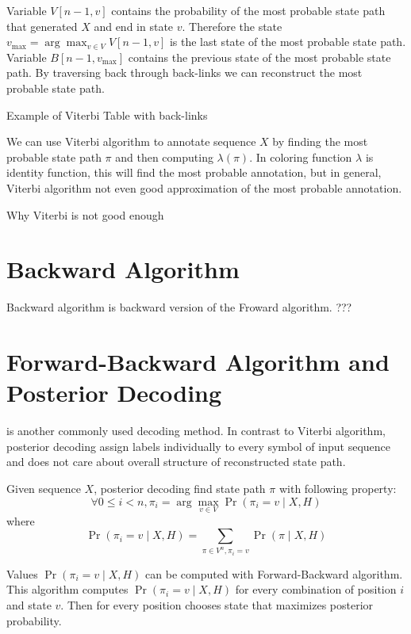 Variable $V[n-1,v]$ contains the probability of the most probable state path
that generated $X$ and end in state $v$. Therefore the state $v_{\max} =
\arg\max_{v\in V}V[n-1,v]$ is the last state of the most probable state path.
Variable $B[n-1,v_{\max}]$ contains the previous state of the most probable
state path. By traversing back through back-links  we can reconstruct the most
probable state path.

\begin{example}
Example of Viterbi Table with back-links
\end{example}

We can use Viterbi algorithm to annotate sequence $X$ by finding the most
probable state path $\pi$ and then computing $\lambda(\pi)$. In coloring
function $\lambda$ is identity function, this will find the most probable
annotation, but in general, Viterbi algorithm not even good approximation of the
most probable annotation.

\begin{example}
Why Viterbi is not good enough
\end{example}

\section{Backward Algorithm}
Backward algorithm is backward version of the Froward algorithm. ???
\section{Forward-Backward Algorithm and Posterior Decoding}
 is another commonly used decoding method. In
contrast to Viterbi algorithm, posterior decoding assign labels individually to
every symbol of input sequence and does not care about overall structure of
reconstructed state path. 

Given sequence $X$, posterior decoding find state path $\pi$ with following
property:
\[\forall 0\leq i< n, \pi_i=\arg\max_{v\in V}\Pr\left(\pi_i=v\mid X,H\right) \]
where \[\Pr\left(\pi_i=v\mid X,H\right) = \sum_{\pi\in V^n,\pi_i=v}\Pr\left(\pi\mid X,H\right)\]

Values $\Pr\left(\pi_i=v\mid X,H\right)$ can be computed with Forward-Backward
algorithm. This algorithm computes $\Pr\left(\pi_i=v\mid X,H\right)$ for every
combination of position $i$ and state $v$. Then for every position chooses state
that maximizes posterior probability.

